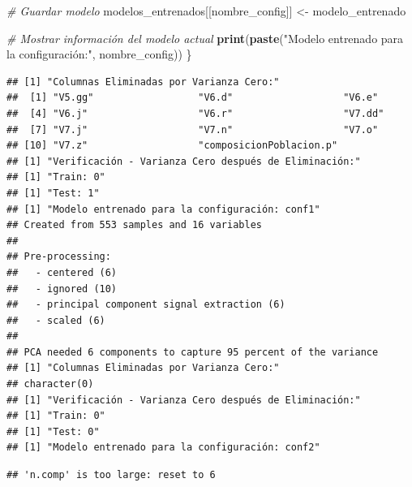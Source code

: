 \documentclass[
]{article}
\newenvironment{Shaded}{\begin{snugshade}}{\end{snugshade}}
\newcommand{\CommentTok}[1]{\textcolor[rgb]{0.56,0.35,0.01}{\textit{#1}}}
\newcommand{\FunctionTok}[1]{\textcolor[rgb]{0.13,0.29,0.53}{\textbf{#1}}}
\newcommand{\NormalTok}[1]{#1}
\newcommand{\OtherTok}[1]{\textcolor[rgb]{0.56,0.35,0.01}{#1}}
\newcommand{\StringTok}[1]{\textcolor[rgb]{0.31,0.60,0.02}{#1}}
\begin{document}
\begin{Shaded}
\begin{Highlighting}[]
  \CommentTok{\# Guardar modelo}
\NormalTok{  modelos\_entrenados[[nombre\_config]] }\OtherTok{\textless{}{-}}\NormalTok{ modelo\_entrenado}
  
  \CommentTok{\# Mostrar información del modelo actual}
  \FunctionTok{print}\NormalTok{(}\FunctionTok{paste}\NormalTok{(}\StringTok{"Modelo entrenado para la configuración:"}\NormalTok{, nombre\_config))}
\NormalTok{\}}
\end{Highlighting}
\end{Shaded}

\begin{verbatim}
## [1] "Columnas Eliminadas por Varianza Cero:"
##  [1] "V5.gg"                  "V6.d"                   "V6.e"                  
##  [4] "V6.j"                   "V6.r"                   "V7.dd"                 
##  [7] "V7.j"                   "V7.n"                   "V7.o"                  
## [10] "V7.z"                   "composicionPoblacion.p"
## [1] "Verificación - Varianza Cero después de Eliminación:"
## [1] "Train: 0"
## [1] "Test: 1"
## [1] "Modelo entrenado para la configuración: conf1"
## Created from 553 samples and 16 variables
## 
## Pre-processing:
##   - centered (6)
##   - ignored (10)
##   - principal component signal extraction (6)
##   - scaled (6)
## 
## PCA needed 6 components to capture 95 percent of the variance
## [1] "Columnas Eliminadas por Varianza Cero:"
## character(0)
## [1] "Verificación - Varianza Cero después de Eliminación:"
## [1] "Train: 0"
## [1] "Test: 0"
## [1] "Modelo entrenado para la configuración: conf2"
\end{verbatim}

\begin{verbatim}
## 'n.comp' is too large: reset to 6
\end{verbatim}
\end{document}
